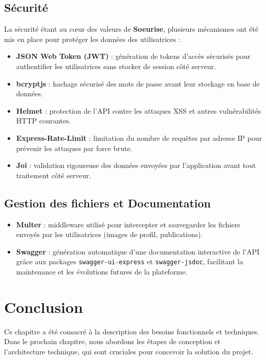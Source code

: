 \documentclass[12pt,a4paper]{report}
\begin{document}
	\subsection{Sécurité}
	
	La sécurité étant au cœur des valeurs de \textbf{Soeurise}, plusieurs mécanismes 
	ont été mis en place pour protéger les données des utilisatrices :
	
	\begin{itemize}
		\item \textbf{JSON Web Token (JWT)} : génération de tokens d'accès sécurisés 
		pour authentifier les utilisatrices sans stocker de session côté serveur.
		\item \textbf{bcryptjs} : hachage sécurisé des mots de passe avant leur 
		stockage en base de données.
		\item \textbf{Helmet} : protection de l'API contre les attaques XSS et 
		autres vulnérabilités HTTP courantes.
		\item \textbf{Express-Rate-Limit} : limitation du nombre de requêtes par 
		adresse IP pour prévenir les attaques par force brute.
		\item \textbf{Joi} : validation rigoureuse des données envoyées par 
		l'application avant tout traitement côté serveur.
	\end{itemize}
	
	\subsection{Gestion des fichiers et Documentation}
	
	\begin{itemize}
		\item \textbf{Multer} : middleware utilisé pour intercepter et sauvegarder 
		les fichiers envoyés par les utilisatrices (images de profil, publications).
		\item \textbf{Swagger} : génération automatique d'une documentation 
		interactive de l'API grâce aux packages \texttt{swagger-ui-express} et 
		\texttt{swagger-jsdoc}, facilitant la maintenance et les évolutions futures 
		de la plateforme.
	\end{itemize}
	
	\section{Conclusion}
	Ce chapitre a été consacré à la description des besoins fonctionnels et techniques.
	Dans le prochain chapitre, nous abordons les étapes de conception et l’architecture
	technique, qui sont cruciales pour concevoir la solution du projet.
\end{document}
